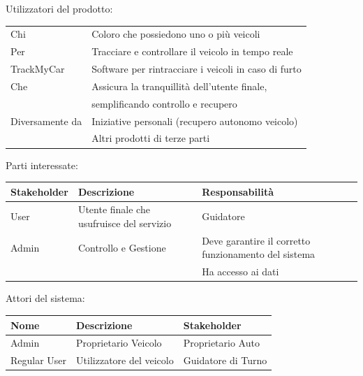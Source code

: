 \documentclass[a4paper,12pt]{beamer}
\begin{document}
\begin{frame}
\begin{table}[h]
Utilizzatori del prodotto:
\begin{center}
\begin{tabular}{ p{4 cm}  p{5 cm} }
\hline	
Chi & Coloro che possiedono uno o più veicoli \\
Per & Tracciare e controllare il veicolo in tempo reale \\ 
TrackMyCar & Software per rintracciare i veicoli in caso di furto \\ 
Che & Assicura la tranquillità dell'utente finale, \\
&semplificando controllo e recupero \\ 
Diversamente da & Iniziative personali (recupero autonomo veicolo) \\ 
&Altri prodotti di terze parti \\ \hline
\end{tabular}
\end{center}
\end{table}
\end{frame}

\begin{frame}
\begin{table}[h]
Parti interessate:
\begin{center}
\begin{tabular}{ p{2 cm}  p{3 cm}  p{4 cm} }
\rowcolor{Ash}	
\hline	
Stakeholder & Descrizione & Responsabilità \\ \hline
User & Utente finale che usufruisce del servizio & Guidatore\\ 
Admin & Controllo e Gestione & Deve garantire il corretto funzionamento del sistema \\ 
 &  & Ha accesso ai dati \\ \hline
\end{tabular}
\end{center}
\end{table}
\end{frame}

\begin{frame}
\begin{table}[h]
Attori del sistema:
\begin{center}
\begin{tabular}{ p{1.5 cm}  p{4 cm}  p{3.5 cm} }
\rowcolor{Ash}	
\hline	
Nome & Descrizione & Stakeholder \\ \hline
Admin & Proprietario Veicolo & Proprietario Auto \\ 
Regular User & Utilizzatore del veicolo & Guidatore di Turno \\ \hline
\end{tabular}
\end{center}
\end{table}
\end{frame}
\end{document}

